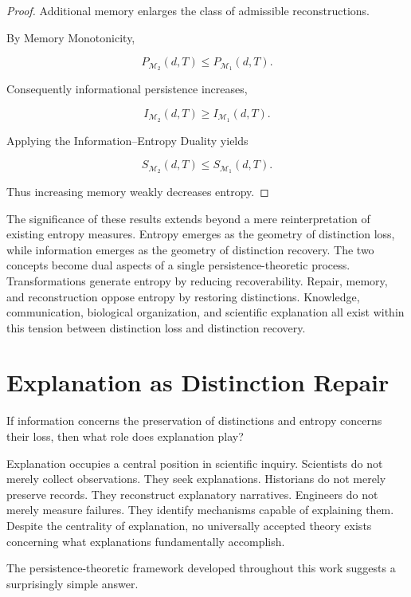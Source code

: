 \documentclass[12pt,oneside]{article}
\theoremstyle{definition}
\begin{document}
\begin{proof}

Additional memory enlarges the class of admissible reconstructions.

By Memory Monotonicity,

\[
P_{\mathcal M_2}(d,T)
\le
P_{\mathcal M_1}(d,T).
\]

Consequently informational persistence increases,

\[
I_{\mathcal M_2}(d,T)
\ge
I_{\mathcal M_1}(d,T).
\]

Applying the Information–Entropy Duality yields

\[
S_{\mathcal M_2}(d,T)
\le
S_{\mathcal M_1}(d,T).
\]

Thus increasing memory weakly decreases entropy.

\end{proof}

The significance of these results extends beyond a mere reinterpretation of existing entropy measures. Entropy emerges as the geometry of distinction loss, while information emerges as the geometry of distinction recovery. The two concepts become dual aspects of a single persistence-theoretic process. Transformations generate entropy by reducing recoverability. Repair, memory, and reconstruction oppose entropy by restoring distinctions. Knowledge, communication, biological organization, and scientific explanation all exist within this tension between distinction loss and distinction recovery.

\section{Explanation as Distinction Repair}

If information concerns the preservation of distinctions and entropy concerns their loss, then what role does explanation play?

Explanation occupies a central position in scientific inquiry. Scientists do not merely collect observations. They seek explanations. Historians do not merely preserve records. They reconstruct explanatory narratives. Engineers do not merely measure failures. They identify mechanisms capable of explaining them. Despite the centrality of explanation, no universally accepted theory exists concerning what explanations fundamentally accomplish.

The persistence-theoretic framework developed throughout this work suggests a surprisingly simple answer.
\end{document}
